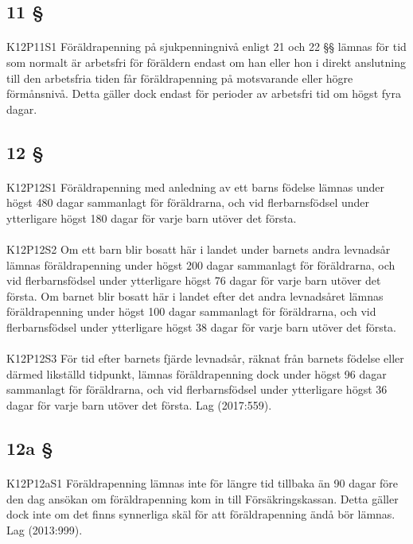 \documentclass[a4paper,notitlepage,openany,10pt]{book}
\begin{document}
\subsection*{11 §}
\paragraph*{}
{\tiny K12P11S1}
Föräldrapenning på sjukpenningnivå enligt 21 och 22 §§ lämnas för tid som normalt är arbetsfri för föräldern endast om han eller hon i direkt anslutning till den arbetsfria tiden får föräldrapenning på motsvarande eller högre förmånsnivå. Detta gäller dock endast för perioder av arbetsfri tid om högst fyra dagar.
\subsection*{12 §}
\paragraph*{}
{\tiny K12P12S1}
Föräldrapenning med anledning av ett barns födelse lämnas under högst 480 dagar sammanlagt för föräldrarna, och vid flerbarnsfödsel under ytterligare högst 180 dagar för varje barn utöver det första.
\paragraph*{}
{\tiny K12P12S2}
Om ett barn blir bosatt här i landet under barnets andra levnadsår lämnas föräldrapenning under högst 200 dagar sammanlagt för föräldrarna, och vid flerbarnsfödsel under ytterligare högst 76 dagar för varje barn utöver det första. Om barnet blir bosatt här i landet efter det andra levnadsåret lämnas föräldrapenning under högst 100 dagar sammanlagt för föräldrarna, och vid flerbarnsfödsel under ytterligare högst 38 dagar för varje barn utöver det första.
\paragraph*{}
{\tiny K12P12S3}
För tid efter barnets fjärde levnadsår, räknat från barnets födelse eller därmed likställd tidpunkt, lämnas föräldrapenning dock under högst 96 dagar sammanlagt för föräldrarna, och vid flerbarnsfödsel under ytterligare högst 36 dagar för varje barn utöver det första.
Lag (2017:559).
\subsection*{12a §}
\paragraph*{}
{\tiny K12P12aS1}
Föräldrapenning lämnas inte för längre tid tillbaka än 90 dagar före den dag ansökan om föräldrapenning kom in till Försäkringskassan. Detta gäller dock inte om det finns synnerliga skäl för att föräldrapenning ändå bör lämnas.
Lag (2013:999).
\end{document}
